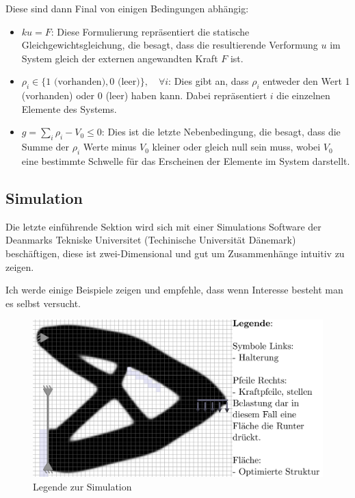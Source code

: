 \documentclass{article}
\begin{document}
Diese sind dann Final von einigen Bedingungen abh\"angig:
\begin{itemize}
    \item $ku = F$: Diese Formulierung repräsentiert die statische
        Gleichgewichtsgleichung, die besagt, dass die resultierende Verformung
        $u$ im System gleich der externen angewandten Kraft $F$ ist. 

    \item $\rho_i \in \{1 \text{ (vorhanden)}, 0 \text{ (leer)}\}, \quad
        \forall i$: Dies gibt an, dass $\rho_i$ entweder den Wert 1 (vorhanden)
        oder 0 (leer) haben kann. Dabei repräsentiert $i$ die einzelnen
        Elemente des Systems.

    \item $g = \sum_i \rho_i - V_0 \leq 0$: Dies ist die letzte Nebenbedingung,
        die besagt, dass die Summe der $\rho_i$ Werte minus $V_0$ kleiner oder
        gleich null sein muss, wobei $V_0$ eine bestimmte Schwelle für das
        Erscheinen der Elemente im System darstellt.
\end{itemize}


\subsection{Simulation}
Die letzte einf\"uhrende Sektion wird sich mit einer Simulations Software
\parencite{aage2014} der Deanmarks Tekniske Universitet (Techinische Universit\"at D\"anemark)
besch\"aftigen, diese ist zwei-Dimensional und gut um Zusammenh\"ange intuitiv zu zeigen.

Ich werde einige Beispiele zeigen und empfehle, dass wenn Interesse besteht man es selbst versucht.

\begin{figure}[H]
    \centering
    \includegraphics[width=1\textwidth]{figures/legende.png}
    \caption{Legende zur Simulation}
    \label{fig:legende}
\end{figure}
\end{document}
